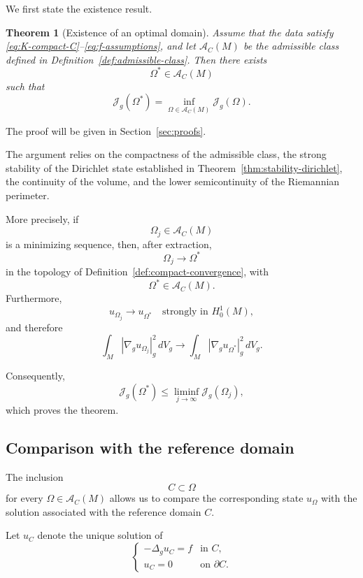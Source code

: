 \documentclass{article}
\renewcommand{\boxed}[1]{#1}
\newtheorem{theorem}{Theorem}[section]
\begin{document}
We first state the existence result.

\begin{theorem}[Existence of an optimal domain]
\label{thm:existence}
Assume that the data satisfy
\eqref{eq:K-compact-C}--\eqref{eq:f-assumptions}, and let
$\mathcal A_C(M)$ be the admissible class defined in
Definition~\ref{def:admissible-class}. Then there exists
\[
\Omega^\ast\in\mathcal A_C(M)
\]
such that
\begin{equation}
\boxed{
\mathcal J_g(\Omega^\ast)
=
\inf_{\Omega\in\mathcal A_C(M)}
\mathcal J_g(\Omega).
}
\label{eq:existence-minimizer}
\end{equation}
\end{theorem}

The proof will be given in Section~\ref{sec:proofs}.

The argument relies on the compactness of the admissible class,
the strong stability of the Dirichlet state established in
Theorem~\ref{thm:stability-dirichlet}, the continuity of the volume,
and the lower semicontinuity of the Riemannian perimeter.

More precisely, if
\[
\Omega_j\in\mathcal A_C(M)
\]
is a minimizing sequence, then, after extraction,
\[
\Omega_j\longrightarrow\Omega^\ast
\]
in the topology of Definition~\ref{def:compact-convergence}, with
\[
\Omega^\ast\in\mathcal A_C(M).
\]
Furthermore,
\[
u_{\Omega_j}\longrightarrow u_{\Omega^\ast}
\quad\text{strongly in }H_0^1(M),
\]
and therefore
\begin{equation}
\int_M
|\nabla_g u_{\Omega_j}|_g^2\,dV_g
\longrightarrow
\int_M
|\nabla_g u_{\Omega^\ast}|_g^2\,dV_g.
\label{eq:energy-convergence-main}
\end{equation}

Consequently,
\[
\mathcal J_g(\Omega^\ast)
\leq
\liminf_{j\to\infty}
\mathcal J_g(\Omega_j),
\]
which proves the theorem.

\subsection{Comparison with the reference domain}
\label{subsec:comparison-C}

The inclusion
\[
C\subset\Omega
\]
for every $\Omega\in\mathcal A_C(M)$ allows us to compare the
corresponding state $u_\Omega$ with the solution associated with the
reference domain $C$.

Let $u_C$ denote the unique solution of
\begin{equation}
\begin{cases}
-\Delta_g u_C=f & \text{in }C,\\
u_C=0 & \text{on }\partial C.
\end{cases}
\label{eq:state-C}
\end{equation}
\end{document}
